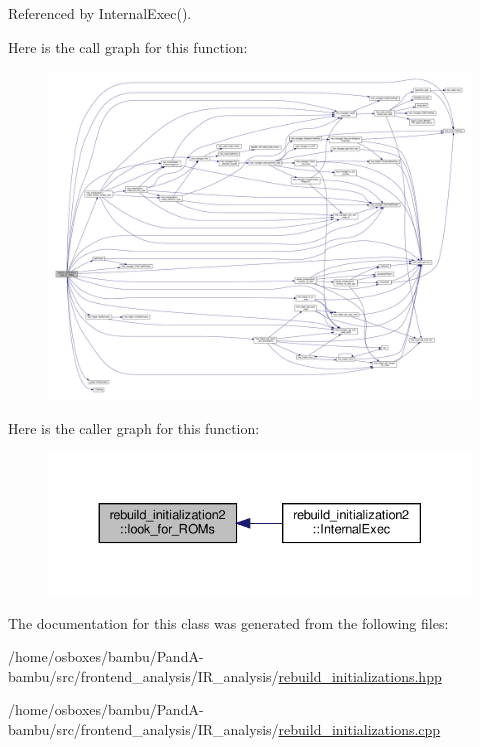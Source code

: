 Referenced by Internal\+Exec().

Here is the call graph for this function\+:
\nopagebreak
\begin{figure}[H]
\begin{center}
\leavevmode
\includegraphics[width=350pt]{db/df3/classrebuild__initialization2_a677aa83a6003323f11929da9609b7344_cgraph}
\end{center}
\end{figure}
Here is the caller graph for this function\+:
\nopagebreak
\begin{figure}[H]
\begin{center}
\leavevmode
\includegraphics[width=330pt]{db/df3/classrebuild__initialization2_a677aa83a6003323f11929da9609b7344_icgraph}
\end{center}
\end{figure}


The documentation for this class was generated from the following files\+:\begin{DoxyCompactItemize}
\item 
/home/osboxes/bambu/\+Pand\+A-\/bambu/src/frontend\+\_\+analysis/\+I\+R\+\_\+analysis/\hyperlink{rebuild__initializations_8hpp}{rebuild\+\_\+initializations.\+hpp}\item 
/home/osboxes/bambu/\+Pand\+A-\/bambu/src/frontend\+\_\+analysis/\+I\+R\+\_\+analysis/\hyperlink{rebuild__initializations_8cpp}{rebuild\+\_\+initializations.\+cpp}\end{DoxyCompactItemize}
